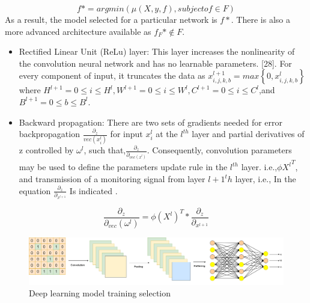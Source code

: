 \documentclass[a4paper,fleqn]{cas-sc}
\begin{document}
\begin{equation}
	f*=argmin(\mu (X,y,f),subject of \in F)
\end{equation}
As a result, the model selected for a particular network is $f*$. There is also a more advanced architecture available as $f_F* \notin F$.
\begin{itemize}
\item Rectified Linear Unit (ReLu) layer: This layer increases the nonlinearity of the convolution neural network and has no learnable parameters. [28]. For every component of input, it truncates the data as $x_{i,j,k,b}^{l+1}=max\left \{0, x_{i,j,k,b}^{l} \right \}$ where $H^{l+1} =0  \leq i \leq H^l,W^{l+1} = 0 \leq i \leq W^l,C^{l+1}=0 \leq i \leq C^l$,and $B^{l+1}=0\leq b \leq B^l$.
\item Backward propagation: There are two sets of gradients needed for error backpropagation $\frac{\partial_z}{vec({x_i^l})} $ for input $x_i^l$ at the $l^{th}$ layer and partial derivatives of z controlled by $\omega^l$, such that,$\frac{\partial_z}{\partial_{vec({x^l})}}$. Consequently, convolution parameters may be used to define the parameters update rule in the $l^{th} $ layer. i.e.,$\phi{X^l }^T$, and transmission of a monitoring signal from layer ${l+1}^th$ layer, i.e., In the equation   $\frac{\partial_z}{\partial_{x^{l+1}}} $ Is indicated \cite{agarap2018deep, agarap1803deep}.
\end{itemize}
\begin{equation}
	\frac{\partial_z}{\partial_{vec}(\omega^l)}=\phi(X^l)^T*\frac{\partial_z}{\partial_{x^{l+1}}}
\end{equation}


\begin{figure}
\includegraphics[width=\textwidth]{deep learning model}
\caption{Deep learning model training selection}
\label{}
\end{figure}
\end{document}
